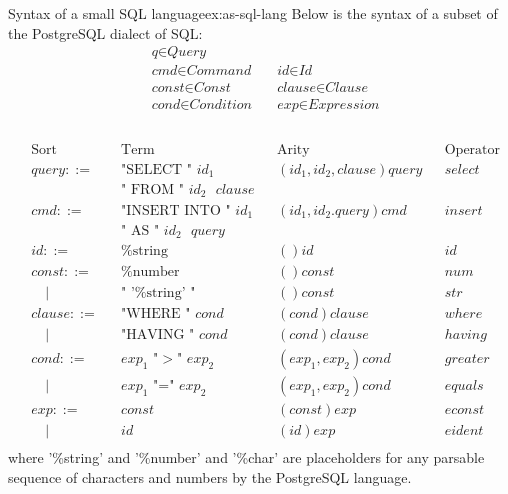 \begin{example}{Syntax of a small SQL language}{ex:as-sql-lang}
  Below is the syntax of a subset of the PostgreSQL\cite{postgresql-about} dialect of SQL:
  \[
    \begin{aligned}
       & \textit{q} \in \textit{Query}                                                       \\
       & \textit{cmd} \in \textit{Command}      \quad & \textit{id} \in \textit{Id}          \\
       & \textit{const} \in \textit{Const}      \quad & \textit{clause} \in \textit{Clause}  \\
       & \textit{cond} \in \textit{Condition}   \quad & \textit{exp} \in \textit{Expression} \\
    \end{aligned}
  \]
  \\
  \[
    \begin{aligned}
       & \text{Sort} &  & \text{Term}                     &   & \text{Arity}            &  & \text{Operator} \\
       & query ::=   &  & \text{"SELECT " $id_1$}         &   & (id_1,id_2,clause)query &  & select          \\
       &             &  & \text{" FROM " $id_2$ $clause$}                                                    \\
       & cmd ::=     &  & \text{"INSERT INTO " $id_1$}    &   & (id_1,id_2.query)cmd    &  & insert          \\
       &             &  & \text{" AS " $id_2$ $query$}    &                                                  \\
       & id ::=      &  & \text{\%string}                 &   & ()id                    &  & id              \\
       & const ::=   &  & \text{\%number}                 &   & ()const                 &  & num             \\
       & \quad |     &  & \text{" '\%string' "}           &   & ()const                 &  & str             \\
       & clause ::=  &  & \text{"WHERE " $cond$}          &   & (cond)clause            &  & where           \\
       & \quad |     &  & \text{"HAVING " $cond$}         &   & (cond)clause            &  & having          \\
       & cond ::=    &  & \text{$exp_1$ "$>$" $exp_2$}    &   & (exp_1,exp_2)cond       &  & greater         \\
       & \quad |     &  & \text{$exp_1$ "=" $exp_2$}      &   & (exp_1,exp_2)cond       &  & equals          \\
       & exp ::=     &  & \text{$const$}                  &   & (const)exp              &  & econst          \\
       & \quad |     &  & \text{$id$}                     &   & (id)exp                 &  & eident          \\
    \end{aligned}
  \]
  where '\%string' and '\%number' and '\%char' are placeholders for any parsable sequence of characters and numbers by the PostgreSQL language.


\end{example}
